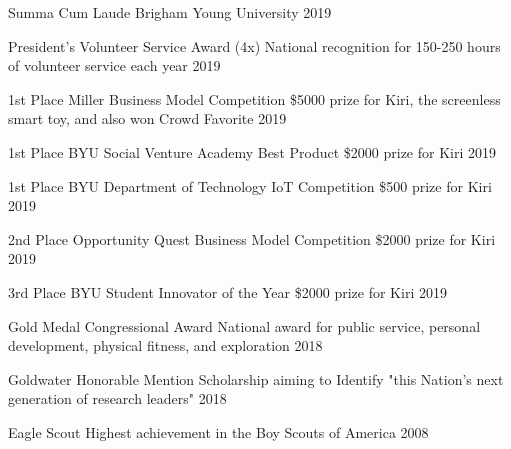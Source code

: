 
\begin{cvhonors}
    
  \cvhonor
    {Summa Cum Laude} %
    {Brigham Young University} %
    {} %
    {2019} %
    
  \cvhonor
    {President's Volunteer Service Award (4x)} %
    {National recognition for 150-250 hours of volunteer service each year} %
    {} %
    {2019} %

  \cvhonor
    {1st Place Miller Business Model Competition} %
    {\$5000 prize for Kiri, the screenless smart toy, and also won Crowd Favorite} %
    {} %
    {2019} %
    
  \cvhonor
    {1st Place BYU Social Venture Academy Best Product} %
    {\$2000 prize for Kiri} %
    {} %
    {2019} %
    
  \cvhonor
    {1st Place BYU Department of Technology IoT Competition} %
    {\$500 prize for Kiri} %
    {} %
    {2019} %
    
      \cvhonor
    {2nd Place Opportunity Quest Business Model Competition} %
    {\$2000 prize for Kiri} %
    {} %
    {2019} %
    
  \cvhonor
    {3rd Place BYU Student Innovator of the Year} %
    {\$2000 prize for Kiri} %
    {} %
    {2019} %

  \cvhonor
    {Gold Medal Congressional Award} %
    {National award for public service, personal development, physical fitness, and exploration} %
    {} %
    {2018} %
    
    
  \cvhonor
    {Goldwater Honorable Mention} %
    {Scholarship aiming to Identify "this Nation's next generation of research leaders"} %
    {} %
    {2018} %
    
  \cvhonor
    {Eagle Scout} %
    {Highest achievement in the Boy Scouts of America} %
    {} %
    {2008} %



\end{cvhonors}

